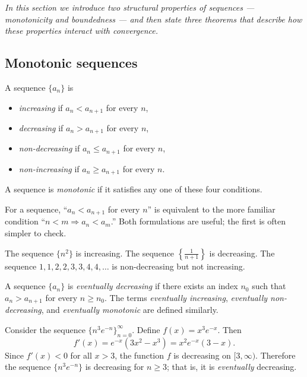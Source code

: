 \textit{In this section we introduce two structural properties of sequences --- monotonicity and boundedness --- and then state three theorems that describe how these properties interact with convergence.}

\subsection*{Monotonic sequences}

\begin{definition}
\label{def:11-4}
A sequence $\{a_{n}\}$ is
\begin{itemize}
  \item \emph{increasing} if $a_{n}<a_{n+1}$ for every $n$,
  \item \emph{decreasing} if $a_{n}>a_{n+1}$ for every $n$,
  \item \emph{non-decreasing} if $a_{n}\le a_{n+1}$ for every $n$,
  \item \emph{non-increasing} if $a_{n}\ge a_{n+1}$ for every $n$.
\end{itemize}
A sequence is \emph{monotonic} if it satisfies any one of these four conditions.
\end{definition}

\begin{remark}
For a sequence, ``$a_{n}<a_{n+1}$ for every $n$'' is equivalent to the more familiar condition ``$n<m \Rightarrow a_{n}<a_{m}$.''  Both formulations are useful; the first is often simpler to check.
\end{remark}

\begin{example}
\label{ex:11-3}
The sequence $\{n^{2}\}$ is increasing.  The sequence $\left\{\frac{1}{n+1}\right\}$ is decreasing.  The sequence $1,1,2,2,3,3,4,4,\dots$ is non-decreasing but not increasing.
\end{example}

\begin{definition}
\label{def:11-5}
A sequence $\{a_{n}\}$ is \emph{eventually decreasing} if there exists an index $n_{0}$ such that $a_{n}>a_{n+1}$ for every $n\ge n_{0}$.  The terms \emph{eventually increasing}, \emph{eventually non-decreasing}, and \emph{eventually monotonic} are defined similarly.
\end{definition}

\begin{example}
\label{ex:11-4}
Consider the sequence $\{n^{3}e^{-n}\}_{n=0}^{\infty}$.  Define $f(x)=x^{3}e^{-x}$.  Then
\[
  f'(x)=e^{-x}(3x^{2}-x^{3})=x^{2}e^{-x}(3-x).
\]
Since $f'(x)<0$ for all $x>3$, the function $f$ is decreasing on $[3,\infty)$.  Therefore the sequence $\{n^{3}e^{-n}\}$ is decreasing for $n\ge 3$; that is, it is \emph{eventually} decreasing.
\end{example}


